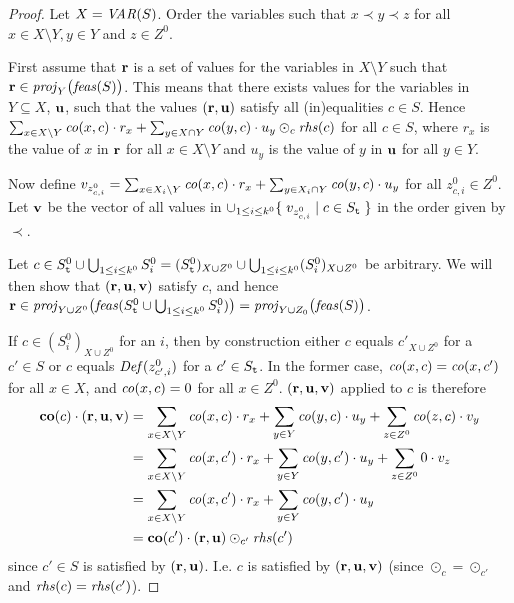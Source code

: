 \separating* %
\begin{proof}
Let $X = \mathit{VAR}(S)$. Order the variables such that $x\prec y\prec z$ for all $x\in X\setminus Y, y\in Y$ and $z\in Z^0$. 

First assume that $\mathbf{r}$ is a set of values for the variables in $X\setminus Y$ such that 
$\mathbf{r}\in \mathit{proj}_Y\big(\mathit{feas}(S)\big)$. This means that there exists values for the variables in $Y\subseteq X$, $\mathbf{u}$, such that the values $(\mathbf{r},\mathbf{u})$ satisfy all (in)equalities $c\in S$. Hence $\sum_{x\in X\setminus Y}\mathit{co}(x,c)\cdot r_x + \sum_{y\in X\cap Y}\mathit{co}(y,c)\cdot u_y \odot_c\mathit{rhs}(c)$ for all $c\in S$, where $r_x$ is the value of $x$ in $\mathbf{r}$ for all $x\in X\setminus Y$ and $u_y$ is the value of $y$ in $\mathbf{u}$ for all $y\in Y$. 

Now define 
$v_{z^0_{c,i}} = \sum_{x\in X_i\setminus Y}\mathit{co}(x,c)\cdot r_x + \sum_{y\in X_i\cap Y}\mathit{co}(y,c)\cdot u_y$ for all $z^0_{c,i}\in Z^0$. Let $\mathbf{v}$ be the vector of all values in $\cup_{1\leq i\leq k^0}\{\;{v_{z^0_{c,i}}}\;|\;{c\in S_{\texttt{t}}}\;\}$ in the order given by $\prec$. 

Let $c\in S^0_{\texttt{t}} \cup\bigcup_{1\leq i\leq k^0} S^0_i = (S^0_{\texttt{t}})_{X\cup Z^0} \cup\bigcup_{1\leq i\leq k^0} (S^0_i)_{X\cup Z^0}$ be arbitrary. We will then show that $(\mathbf{r},\mathbf{u}, \mathbf{v})$ satisfy $c$, and hence $\mathbf{r}\in \mathit{proj}_{Y\cup Z^0}\big(\mathit{feas}(S^0_{\texttt{t}}\cup\bigcup_{1\leq i\leq k^0} S^0_i)\big)=\mathit{proj}_{Y\cup Z_0}\big(\mathit{feas}(S)\big)$. 

If $c \in (S^0_i)_{X\cup Z^0}$ for an $i$, then by construction either $c$ equals $c'_{X\cup Z^0}$ for a $c'\in S$ or $c$ equals $\mathit{Def}(z^0_{c',i})$ for a $c'\in S_{\texttt{t}}$. 
In the former case, $\mathit{co}(x,c) = \mathit{co}(x,c')$ for all $x\in X$, and $\mathit{co}(x,c) = 0$ for all $x\in Z^0$.
$(\mathbf{r},\mathbf{u},\mathbf{v})$ applied to $c$ is therefore
\begin{align*}
\mathbf{co}(c)\cdot (\mathbf{r},\mathbf{u}, \mathbf{v})
&=\sum_{x\in X\setminus Y}\mathit{co}(x,c)\cdot r_x + \sum_{y\in Y}\mathit{co}(y,c)\cdot u_y + \sum_{z\in Z^0}\mathit{co}(z,c)\cdot v_y\\
&= \sum_{x\in X\setminus Y}\mathit{co}(x,c')\cdot r_x + \sum_{y\in Y}\mathit{co}(y,c')\cdot u_y 
 + \sum_{z\in Z^0} 0 \cdot v_z\\
&= \sum_{x\in X\setminus Y}\mathit{co}(x,c')\cdot r_x + \sum_{y\in Y}\mathit{co}(y,c')\cdot u_y \\
&=\mathbf{co}(c')\cdot(\mathbf{r},\mathbf{u})\odot_{c'}\mathit{rhs}(c')
\end{align*}
since $c'\in S$ is satisfied by $(\mathbf{r},\mathbf{u})$. I.e. $c$ is satisfied by $(\mathbf{r},\mathbf{u}, \mathbf{v})$ (since $\odot_c = \odot_{c'}$ and $\mathit{rhs}(c)=\mathit{rhs}(c')$). 


\end{proof}
